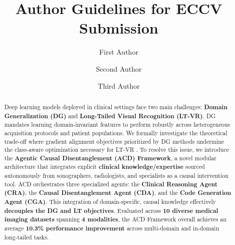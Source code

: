 \documentclass[runningheads]{llncs}
\begin{document}
\title{Author Guidelines for ECCV Submission} 


\author{First Author \and
Second Author \and
Third Author}



\maketitle


\begin{abstract}
Deep learning models deployed in clinical settings face two main challenges: \textbf{Domain Generalization (DG)} and \textbf{Long-Tailed Visual Recognition (LT-VR)}. DG mandates learning domain-invariant features to perform robustly across heterogeneous acquisition protocols and patient populations. We formally investigate the theoretical trade-off where gradient alignment objectives prioritized by DG methods undermine the class-aware optimization necessary for LT-VR . To resolve this issue, we introduce the \textbf{Agentic Causal Disentanglement (ACD) Framework}, a novel modular architecture that integrates explicit \textbf{clinical knowledge/expertise} sourced autonomously from sonographers, radiologists, and specialists as a causal intervention tool. ACD orchestrates three specialized agents: the \textbf{Clinical Reasoning Agent (CRA)}, the \textbf{Causal Disentanglement Agent (CDA)}, and the \textbf{Code Generation Agent (CGA)}. This integration of domain-specific, causal knowledge effectively \textbf{decouples the DG and LT objectives}. Evaluated across \textbf{10 diverse medical imaging datasets} spanning \textbf{4 modalities}, the ACD Framework overall achieves an average \textbf{10.3\% performance improvement} across multi-domain and in-domain long-tailed tasks. 
\end{abstract}
\end{document}
